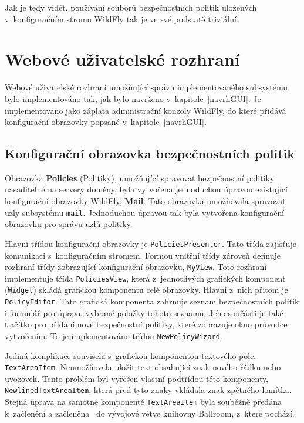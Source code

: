 Jak je tedy vidět, používání souborů bezpečnostních politik uložených v~konfiguračním stromu WildFly tak je ve své podstatě triviální.

\section{Webové uživatelské rozhraní}

Webové uživatelské rozhraní umožňující správu implementovaného subsystému bylo implementováno tak, jak bylo navrženo v~kapitole~\ref{navrhGUI}.
Je implementováno jako záplata administrační konzoly WildFly, do které přidává konfigurační obrazovky popsané v~kapitole~\ref{navrhGUI}.

\subsection{Konfigurační obrazovka bezpečnostních politik} \label{implGuiPolicies}

Obrazovka {\bf Policies} (Politiky), umožňující spravovat bezpečnostní politiky nasaditelné na servery domény, byla vytvořena jednoduchou úpravou existující konfigurační obrazovky WildFly, {\bf Mail}.
Tato obrazovka umožňovala spravovat uzly subsystému {\tt mail}.
Jednoduchou úpravou tak byla vytvořena konfigurační obrazovku pro správu uzlů politiky.

Hlavní třídou konfigurační obrazovky je {\tt PoliciesPresenter}. Tato třída zajišťuje komunikaci s~konfiguračním stromem. Formou vnitřní třídy zároveň definuje rozhraní třídy zobrazující konfigurační obrazovku, {\tt MyView}. Toto rozhraní implementuje třída {\tt PoliciesView}, která z~jednotlivých grafických komponent ({\tt Widget}) skládá grafickou komponentu celé obrazovky.
Hlavní z~nich přitom je {\tt PolicyEditor}. Tato grafická komponenta zahrnuje seznam bezpečnostních politik i formulář pro úpravu vybrané položky tohoto seznamu. Jeho součástí je také tlačítko pro přidání nové bezpečnostní politiky, které zobrazuje okno průvodce vytvořením. To je implementováno třídou {\tt NewPolicyWizard}.

Jediná komplikace souvisela s~grafickou komponentou textového pole, {\tt TextAreaItem}. Neumožňovala uložit text obsahující znak nového řádku nebo uvozovek. Tento problém byl vyřešen vlastní podtřídou této komponenty, {\tt NewlinedTextAreaItem}, která před tyto znaky vkládala znak zpětného lomítka. Stejná úprava na samotné komponentě {\tt TextAreaItem} byla souběžně předána k~začlenění a začleněna~\cite{textareaPullRequest} do vývojové větve knihovny Ballroom, z~které pochází.

